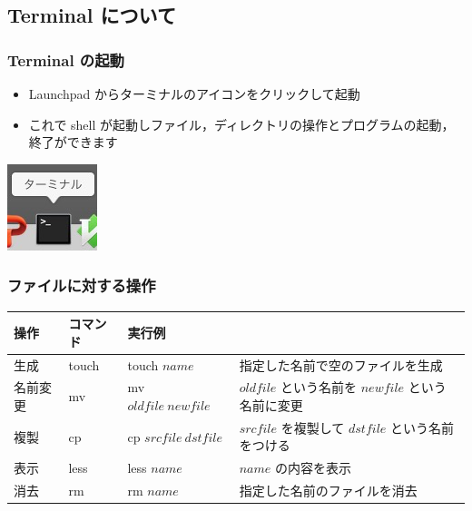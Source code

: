 %
%
\subsection{Terminal について}
\begin{frame}[containsverbatim]
\frametitle{Terminal の起動}
  \begin{itemize}
\item Launchpad からターミナルのアイコンをクリックして起動
\item これで shell が起動しファイル，ディレクトリの操作とプログラムの起動，終了ができます
  \end{itemize}
  \begin{center}
\includegraphics[scale=0.5]{./Figure/elementaryCS-figTermIcon.jpg}
  \end{center}
\end{frame}
\begin{frame}
\frametitle{ファイルに対する操作}
\scriptsize
  \begin{tabular}{l|l|lp{4cm}}
操作 & コマンド & 実行例 & \\\hline
生成 & touch & touch $name$ & 指定した名前で空のファイルを生成\\
名前変更 & mv & mv $oldfile\ newfile$ & $oldfile$ という名前を $newfile$ という名前に変更\\
複製 & cp & cp $srcfile\ dstfile$ & $srcfile$ を複製して $dstfile$ という名前をつける\\
表示 & less & less $name$ & $name$ の内容を表示\\
消去 & rm & rm $name$ & 指定した名前のファイルを消去
  \end{tabular}
\end{frame}

